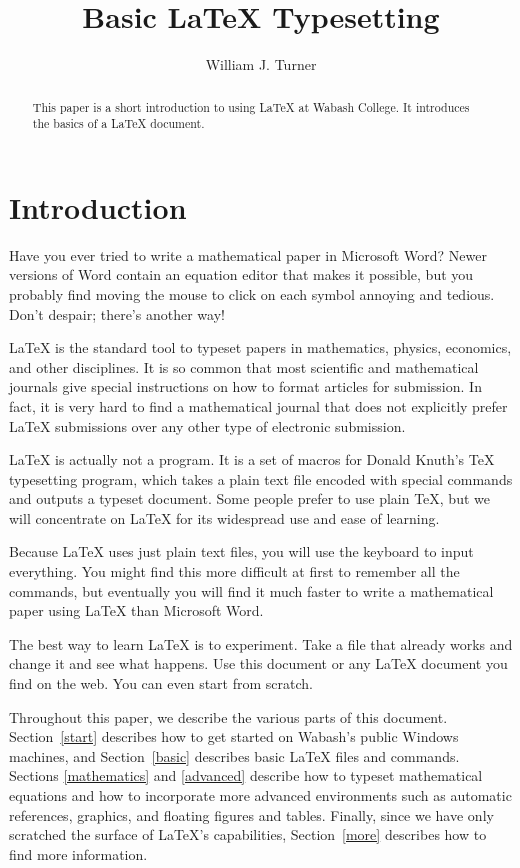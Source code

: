 \documentclass[titlepage]{article}                %
\title{Basic \LaTeX{} Typesetting}
\author{William J. Turner}
\theoremstyle{definition}
\theoremstyle{remark}
\begin{document}
\maketitle

\begin{abstract}
This paper is a short introduction to using \LaTeX{} at Wabash College.  It
introduces the basics of a \LaTeX{} document.
\end{abstract}

\tableofcontents

\clearpage

\section{Introduction}
\label{intro}

Have you ever tried to write a mathematical paper in Microsoft Word?  Newer
versions of Word contain an equation editor that makes it possible, but you
probably find moving the mouse to click on each symbol annoying and tedious.
Don't despair; there's another way!

\LaTeX{} is the standard tool to typeset papers in mathematics, physics,
economics, and other disciplines.  It is so common that most scientific and
mathematical journals give special instructions on how to format articles for
submission.  In fact, it is very hard to find a mathematical journal that does
not explicitly prefer \LaTeX{} submissions over any other type of electronic
submission.

\LaTeX{} is actually not a program.  It is a set of macros for Donald Knuth's
\TeX{} typesetting program, which takes a plain text file encoded with special
commands and outputs a typeset document.  Some people prefer to use plain
\TeX{}, but we will concentrate on \LaTeX{} for its widespread use and ease of
learning.

Because \LaTeX{} uses just plain text files, you will use the keyboard to
input everything.  You might find this more difficult at first to remember all
the commands, but eventually you will find it much faster to write a
mathematical paper using \LaTeX{} than Microsoft Word.

The best way to learn \LaTeX{} is to experiment.  Take a file that already
works and change it and see what happens.  Use this document or any \LaTeX{}
document you find on the web.  You can even start from scratch.

Throughout this paper, we describe the various parts of this document.
Section~\ref{start} describes how to get started on Wabash's public Windows
machines, and Section~\ref{basic} describes basic \LaTeX{} files and commands.
Sections \ref{mathematics} and \ref{advanced} describe how to typeset
mathematical equations and how to incorporate more advanced environments such
as automatic references, graphics, and floating figures and tables.  Finally,
since we have only scratched the surface of \LaTeX{}'s capabilities,
Section~\ref{more} describes how to find more information.
\end{document}
